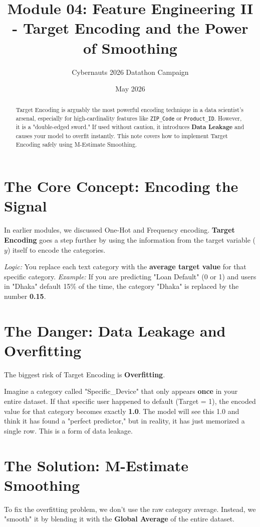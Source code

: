 \documentclass{article}
\title{Module 04: Feature Engineering II - Target Encoding and the Power of Smoothing}
\author{Cybernauts 2026 Datathon Campaign}
\date{May 2026}
\begin{document}
\maketitle

\begin{abstract}
Target Encoding is arguably the most powerful encoding technique in a data scientist's arsenal, especially for high-cardinality features like \texttt{ZIP\_Code} or \texttt{Product\_ID}. However, it is a "double-edged sword." If used without caution, it introduces \textbf{Data Leakage} and causes your model to overfit instantly. This note covers how to implement Target Encoding safely using M-Estimate Smoothing.
\end{abstract}

\tableofcontents
\newpage

\section{The Core Concept: Encoding the Signal}
In earlier modules, we discussed One-Hot and Frequency encoding. \textbf{Target Encoding} goes a step further by using the information from the target variable ($y$) itself to encode the categories.

\textit{Logic:} You replace each text category with the \textbf{average target value} for that specific category.
\textit{Example:} If you are predicting "Loan Default" (0 or 1) and users in "Dhaka" default 15\% of the time, the category "Dhaka" is replaced by the number \textbf{0.15}.

\section{The Danger: Data Leakage and Overfitting}
The biggest risk of Target Encoding is \textbf{Overfitting}. 
\begin{tcolorbox}[colback=red!5!white,colframe=red!75!black,title=The Single-Row Trap]
Imagine a category called "Specific\_Device" that only appears \textbf{once} in your entire dataset. If that specific user happened to default (Target = 1), the encoded value for that category becomes exactly \textbf{1.0}. 
The model will see this 1.0 and think it has found a "perfect predictor," but in reality, it has just memorized a single row. This is a form of data leakage.
\end{tcolorbox}

\section{The Solution: M-Estimate Smoothing}
To fix the overfitting problem, we don't use the raw category average. Instead, we "smooth" it by blending it with the \textbf{Global Average} of the entire dataset.
\end{document}
